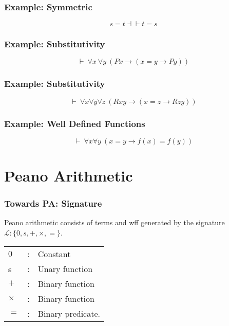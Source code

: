 \documentclass{beamer}
\theoremstyle{indentDefn} \newtheorem{defn}[]{Definition}
\begin{document}
\begin{frame}
	\frametitle{Example: Symmetric}

	$$ s = t \dashv \vdash t = s $$

	\vspace{65mm}
\end{frame}

\begin{frame}
	\frametitle{Example: Substitutivity}

	$$\vdash \ \forall x \ \forall y \ (Px \to (x = y \to Py))$$

	\vspace{65mm}

\end{frame}

\begin{frame}
	\frametitle{Example: Substitutivity}

	$$\vdash \ \forall x \forall y \forall z \ (Rxy \to (x = z \to Rzy))$$

	\vspace{6.5cm}

\end{frame}

\begin{frame}
	\frametitle{Example: Well Defined Functions}

	$$\vdash \ \forall x \forall y \ (x=y \to f(x)=f(y))$$

	\vspace{6.5cm}

\end{frame}

\section{Peano Arithmetic}

\begin{frame}
	\frametitle{Towards PA: Signature}

	Peano arithmetic consists of terms and wff generated by the signature $\mathcal{L} : \{0,s,+,\times,=\}$.

	\begin{center}
		\begin{tabular}{l c l}
			$0$ & : & Constant \\
			s & : & Unary function \\
			$+$ & : & Binary function \\
			$\times$ & : & Binary function \\
			$=$ & : & Binary predicate.
		\end{tabular}
	\end{center}

	\vspace{3cm}

\end{frame}
\end{document}
